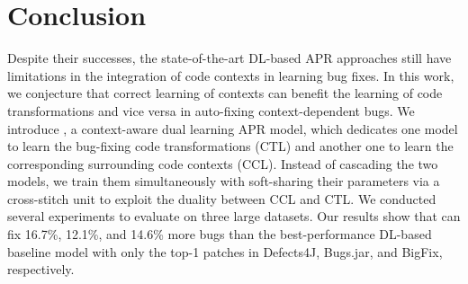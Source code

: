 \section{Conclusion}

Despite their successes, the state-of-the-art DL-based APR approaches
still have limitations in the integration of code contexts in learning
bug fixes. In this work, we conjecture that correct learning of
contexts can benefit the learning of code transformations and vice
versa in auto-fixing context-dependent bugs. We introduce {\tool}, a
context-aware dual learning APR model, which dedicates one model to
learn the bug-fixing code transformations (CTL) and another one to
learn the corresponding surrounding code contexts (CCL). Instead of
cascading the two models, we train them simultaneously with
soft-sharing their parameters via a cross-stitch unit to exploit the
duality between CCL and CTL. We conducted several experiments to
evaluate {\tool} on three large datasets.  Our results show that
{\tool} can fix 16.7\%, 12.1\%, and 14.6\% more bugs than the
best-performance DL-based baseline model with only the top-1 patches
in Defects4J, Bugs.jar, and BigFix, respectively.
